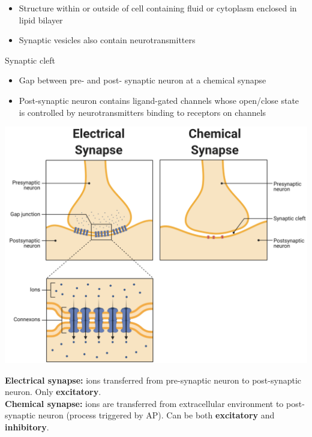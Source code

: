 \documentclass[11pt,fleqn]{book}
\begin{document}
\begin{descriptions}
\begin{itemize}
        \item Structure within or outside of cell containing fluid or cytoplasm enclosed in lipid bilayer
        \item Synaptic vesicles also contain neurotransmitters
    \end{itemize}
    \item[Synaptic cleft]
    \begin{descriptions}
    \end{descriptions}
    \begin{itemize}
        \item Gap between pre- and post- synaptic neuron at a chemical synapse 
        \item Post-synaptic neuron contains ligand-gated channels whose open/close state is controlled by neurotransmitters binding to receptors on channels
    \end{itemize}
\end{descriptions}
\begin{center}
    \includegraphics[width=0.65\linewidth]{Pictures/Screenshot 2024-02-26 005340.png}
\end{center}
\begin{remark}
    \textbf{Electrical synapse:} ions transferred from pre-synaptic neuron to post-synaptic neuron. Only \textbf{excitatory}.\\
    \textbf{Chemical synapse:} ions are transferred from extracellular environment to post-synaptic neuron (process triggered by AP). Can be both \textbf{excitatory} and \textbf{inhibitory}.
\end{remark}
\end{document}
